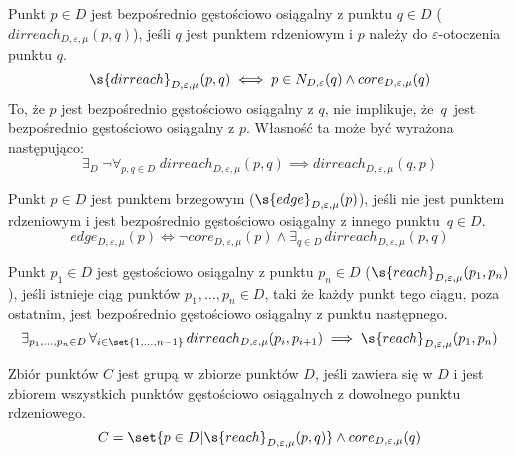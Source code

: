 \newline
Punkt $ p \in D $ jest bezpośrednio gęstościowo osiągalny z punktu $ q \in D $ ($ dirreach_{D,\varepsilon,\mu}(p, q) $), jeśli $ q $ jest punktem rdzeniowym i $ p $ należy do $ \varepsilon $-otoczenia punktu $ q $.
\begin{equation} \label{direct-reachability}
	\s{dirreach}_{D,\varepsilon,\mu}(p, q) \iff p \in N_{D,\varepsilon}(q) \land core_{D,\varepsilon,\mu}(q)
\end{equation}
To, że $ p $ jest bezpośrednio gęstościowo osiągalny z $ q $, nie implikuje, \mbox{że $ q $ jest} bezpośrednio gęstościowo osiągalny z $ p $. Własność ta może być wyrażona następująco:
\begin{equation} \label{direct-reachability-asymmetry}
	\exists_D\;\neg\forall_{p,q\in D}\;dirreach_{D,\varepsilon,\mu}(p, q) \implies dirreach_{D,\varepsilon,\mu}(q, p)
\end{equation}

\pagebreak{}\newline
Punkt $ p \in D $ jest punktem brzegowym ($ \s{edge}_{D,\varepsilon,\mu}(p) $), jeśli nie jest punktem rdzeniowym i jest bezpośrednio gęstościowo osiągalny z innego \mbox{punktu $ q \in D $}.
\begin{equation}\label{edge-point}
	edge_{D,\varepsilon,\mu}(p) \iff \neg core_{D,\varepsilon,\mu}(p) \land \exists_{q\in D}\, dirreach_{D,\varepsilon,\mu}(p,q)
\end{equation}

\newline
Punkt $ p_1 \in D$ jest gęstościowo osiągalny z punktu $ p_n\in D $ ($ \s{reach}_{D,\varepsilon,\mu}(p_1, p_n) $), jeśli istnieje ciąg punktów $ p_1,\dots,p_n \in D $, taki że każdy punkt tego ciągu, poza ostatnim, jest bezpośrednio gęstościowo osiągalny z punktu następnego.
\begin{equation}
	\exists_{p_1,\dots,p_n\in D}\,\forall_{i\in\set{1,\dots,n-1}}\,dirreach_{D,\varepsilon,\mu}(p_i, p_{i+1}) \implies \s{reach}_{D,\varepsilon,\mu}(p_1, p_n)
\end{equation}



\newline
Zbiór punktów $ C $ jest grupą w zbiorze punktów $ D $, jeśli zawiera się w $ D $ i jest zbiorem wszystkich punktów gęstościowo osiągalnych z dowolnego punktu rdzeniowego. 
\begin{equation}\label{eq:cluster-def}
C = \set{p \in D | \s{reach}_{D,\varepsilon,\mu}(p, q)} \land core_{D,\varepsilon,\mu}(q)
\end{equation}

